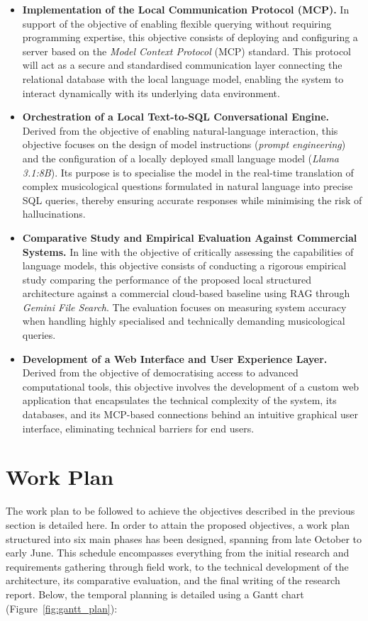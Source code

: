 \begin{itemize}
\item \textbf{Implementation of the Local Communication Protocol (MCP).} In support of the objective of enabling flexible querying without requiring programming expertise, this objective consists of deploying and configuring a server based on the \textit{Model Context Protocol} (MCP) standard. This protocol will act as a secure and standardised communication layer connecting the relational database with the local language model, enabling the system to interact dynamically with its underlying data environment.
\item \textbf{Orchestration of a Local Text-to-SQL Conversational Engine.} Derived from the objective of enabling natural-language interaction, this objective focuses on the design of model instructions (\textit{prompt engineering}) and the configuration of a locally deployed small language model (\textit{Llama 3.1:8B}). Its purpose is to specialise the model in the real-time translation of complex musicological questions formulated in natural language into precise SQL queries, thereby ensuring accurate responses while minimising the risk of hallucinations.
\item \textbf{Comparative Study and Empirical Evaluation Against Commercial Systems.} In line with the objective of critically assessing the capabilities of language models, this objective consists of conducting a rigorous empirical study comparing the performance of the proposed local structured architecture against a commercial cloud-based baseline using RAG through \textit{Gemini File Search}. The evaluation focuses on measuring system accuracy when handling highly specialised and technically demanding musicological queries.
\item \textbf{Development of a Web Interface and User Experience Layer.} Derived from the objective of democratising access to advanced computational tools, this objective involves the development of a custom web application that encapsulates the technical complexity of the system, its databases, and its MCP-based connections behind an intuitive graphical user interface, eliminating technical barriers for end users.
\end{itemize}

\section{Work Plan}
The work plan to be followed to achieve the objectives described in the previous section is detailed here. In order to attain the proposed objectives, a work plan structured into six main phases has been designed, spanning from late October to early June. This schedule encompasses everything from the initial research and requirements gathering through field work, to the technical development of the architecture, its comparative evaluation, and the final writing of the research report. Below, the temporal planning is detailed using a Gantt chart (Figure~\ref{fig:gantt_plan}):

